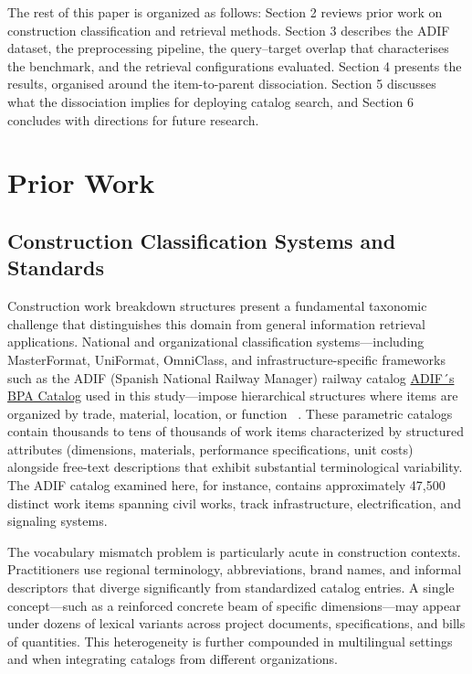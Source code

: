 \documentclass[preprint,12pt]{elsarticle}
\begin{document}
The rest of this paper is organized as follows: Section 2 reviews prior work on construction classification and retrieval methods. Section 3 describes the ADIF dataset, the preprocessing pipeline, the query--target overlap that characterises the benchmark, and the retrieval configurations evaluated. Section 4 presents the results, organised around the item-to-parent dissociation. Section 5 discusses what the dissociation implies for deploying catalog search, and Section 6 concludes with directions for future research.

\section{Prior Work}

\subsection{Construction Classification Systems and Standards}

Construction work breakdown structures present a fundamental taxonomic challenge that distinguishes this domain from general information retrieval applications. National and organizational classification systems—including MasterFormat, UniFormat, OmniClass, and infrastructure-specific frameworks such as the ADIF (Spanish National Railway Manager) railway catalog \href{https://bpa.adif.es/bp1/#/welcome}{ADIF´s BPA Catalog} used in this study—impose hierarchical structures where items are organized by trade, material, location, or function ~\cite{royanoAnalysisClassificationSystems2023a, guvenConstructionClassificationSystem2022}. These parametric catalogs contain thousands to tens of thousands of work items characterized by structured attributes (dimensions, materials, performance specifications, unit costs) alongside free-text descriptions that exhibit substantial terminological variability. The ADIF catalog examined here, for instance, contains approximately 47,500 distinct work items spanning civil works, track infrastructure, electrification, and signaling systems.

The vocabulary mismatch problem is particularly acute in construction contexts. Practitioners use regional terminology, abbreviations, brand names, and informal descriptors that diverge significantly from standardized catalog entries. A single concept—such as a reinforced concrete beam of specific dimensions—may appear under dozens of lexical variants across project documents, specifications, and bills of quantities. This heterogeneity is further compounded in multilingual settings and when integrating catalogs from different organizations. 
\end{document}
